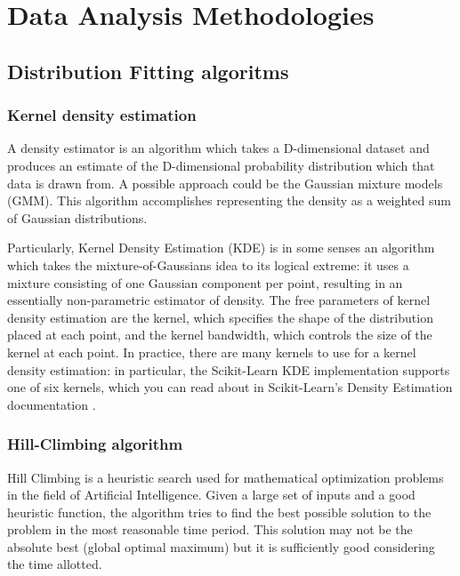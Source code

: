 \section{Data Analysis Methodologies}
\label{sub:data_analysis_methodologies}

\subsection{Distribution Fitting algoritms}

\subsubsection{Kernel density estimation}
\label{subsub:kernel_density}

 A density estimator is an algorithm which takes a D-dimensional dataset and produces an estimate of the D-dimensional probability distribution which that data is drawn from. A possible approach could be the Gaussian mixture models (GMM). This algorithm accomplishes representing the density as a weighted sum of Gaussian distributions.
 
 Particularly, Kernel Density Estimation (KDE) is in some senses an algorithm which takes the mixture-of-Gaussians idea to its logical extreme: it uses a mixture consisting of one Gaussian component per point, resulting in an essentially non-parametric estimator of density. 
The free parameters of kernel density estimation are the kernel, which specifies the shape of the distribution placed at each point, and the kernel bandwidth, which controls the size of the kernel at each point. In practice, there are many kernels to use for a kernel density estimation: in particular, the Scikit-Learn KDE implementation supports one of six kernels, which you can read about in Scikit-Learn's Density Estimation documentation \cite{KernelDensityEstimation}.

\subsubsection{Hill-Climbing algorithm}
\label{subsub:hill_climbing_algorithm}
Hill Climbing is a heuristic search used for mathematical optimization problems in the field of Artificial Intelligence. Given a large set of inputs and a good heuristic function, the algorithm tries to find the best possible solution to the problem in the most reasonable time period. This solution may not be the absolute best (global optimal maximum) but it is sufficiently good considering the time allotted\cite{Kvasnicka1995HillCW}.

